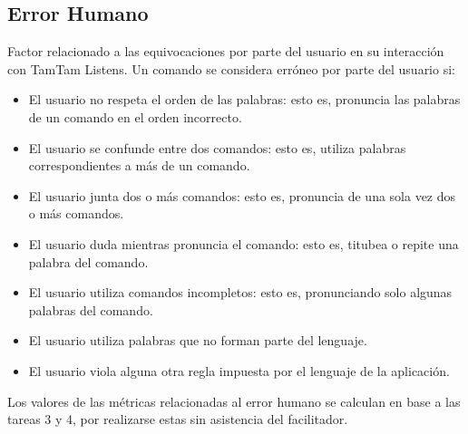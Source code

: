 \subsection{Error Humano}
Factor relacionado a las equivocaciones por parte del usuario en su interacci\'on con
TamTam Listens.
Un comando se considera err\'oneo por parte del usuario si:
\begin{itemize}
	\item El usuario no respeta el orden de las palabras: esto es, pronuncia las palabras de un comando 
	en el orden incorrecto.
	\item El usuario se confunde entre dos comandos: esto es, utiliza palabras correspondientes a m\'as
	de un comando.
	\item El usuario junta dos o m\'as comandos: esto es, pronuncia de una sola vez dos o m\'as comandos.
	\item El usuario duda mientras pronuncia el comando: esto es, titubea o repite una palabra del 
	comando.
	\item El usuario utiliza comandos incompletos: esto es, pronunciando solo algunas palabras del 
	comando.
	\item El usuario utiliza palabras que no forman parte del lenguaje.
	\item El usuario viola alguna otra regla impuesta por el lenguaje de la aplicaci\'on.
\end{itemize}
Los valores de las m\'etricas relacionadas al error humano se calculan
en base a las tareas 3 y 4, por realizarse estas sin asistencia del facilitador. 

